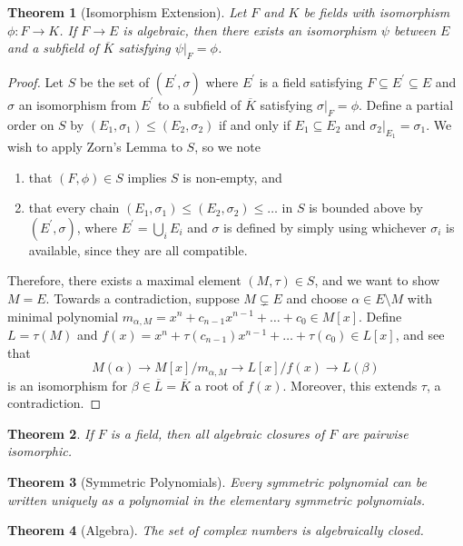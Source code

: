\documentclass[
    parskip=half,
    toc=flat,
    toc=sectionentrydotfill,
]{scrartcl}  %
\theoremstyle{definition}
\theoremstyle{plain}
\newtheorem{theorem}{Theorem}[section]
\theoremstyle{remark}
\begin{document}
\begin{theorem}[Isomorphism Extension]
    Let $F$ and $K$ be fields with isomorphism $\phi:F\to K$.
    If $F\to E$ is algebraic, then there exists an isomorphism $\psi$ between $E$ and a subfield of $\overline{K}$
    satisfying $\psi\vert_F=\phi$.
\end{theorem}

\begin{proof}
    Let $S$ be the set of $(E^\prime,\sigma)$ where $E^\prime$ is a field satisfying $F\subseteq E^\prime\subseteq E$
    and $\sigma$ an isomorphism from $E^\prime$ to a subfield of $\overline{K}$ satisfying $\sigma\vert_F=\phi$.
    Define a partial order on $S$ by $(E_1,\sigma_1)\leq (E_2,\sigma_2)$ if and only if $E_1\subseteq E_2$ and
    $\sigma_2\vert_{E_1}=\sigma_1$.
    We wish to apply Zorn's Lemma to $S$, so we note
    \begin{enumerate}
        \item that $(F,\phi)\in S$ implies $S$ is non-empty, and

        \item
            that every chain $(E_1,\sigma_1)\leq(E_2,\sigma_2)\leq\dots$ in $S$ is bounded above by
            $(E^\prime,\sigma)$, where $E^\prime=\bigcup_iE_i$ and $\sigma$ is defined by simply using whichever
            $\sigma_i$ is available, since they are all compatible.
    \end{enumerate}
    Therefore, there exists a maximal element $(M,\tau)\in S$, and we want to show $M=E$.
    Towards a contradiction, suppose $M\subsetneq E$ and choose $\alpha\in E\setminus M$ with minimal polynomial
    $m_{\alpha,M}=x^n+c_{n-1}x^{n-1}+\dots+c_0\in M[x]$.
    Define $L=\tau(M)$ and $f(x)=x^n+\tau(c_{n-1})x^{n-1}+\dots+\tau(c_0)\in L[x]$, and see that
    \[M(\alpha)\to M[x]/m_{\alpha,M}\to L[x]/f(x)\to L(\beta)\]
    is an isomorphism for $\beta\in\overline{L}=\overline{K}$ a root of $f(x)$.
    Moreover, this extends $\tau$, a contradiction.
\end{proof}

\begin{theorem}
    If $F$ is a field, then all algebraic closures of $F$ are pairwise isomorphic.
\end{theorem}

\begin{theorem}[Symmetric Polynomials]
    Every symmetric polynomial can be written uniquely as a polynomial in the elementary symmetric polynomials.
\end{theorem}

\begin{theorem}[Algebra]
    The set of complex numbers is algebraically closed.
\end{theorem}
\end{document}
